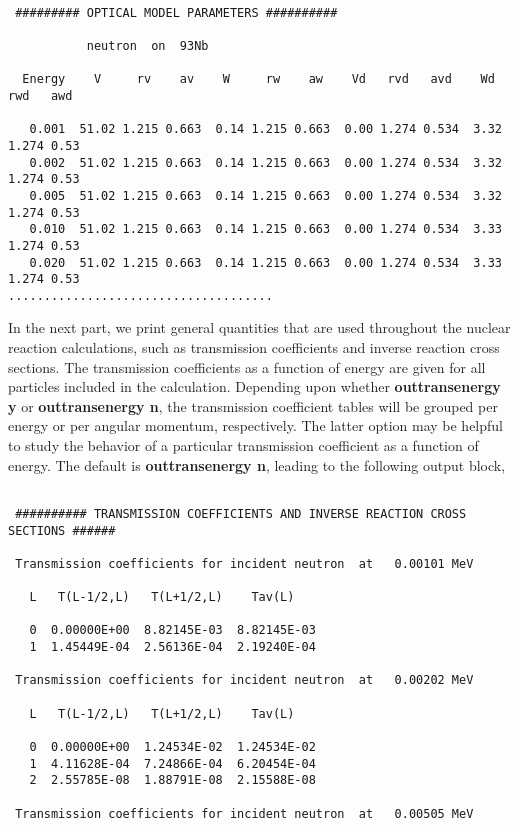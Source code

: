 \begin{samplecase}
{\small \begin{verbatim}

 ######### OPTICAL MODEL PARAMETERS ##########
 
           neutron  on  93Nb
 
  Energy    V     rv    av    W     rw    aw    Vd   rvd   avd    Wd   rwd   awd

   0.001  51.02 1.215 0.663  0.14 1.215 0.663  0.00 1.274 0.534  3.32 1.274 0.53
   0.002  51.02 1.215 0.663  0.14 1.215 0.663  0.00 1.274 0.534  3.32 1.274 0.53
   0.005  51.02 1.215 0.663  0.14 1.215 0.663  0.00 1.274 0.534  3.32 1.274 0.53
   0.010  51.02 1.215 0.663  0.14 1.215 0.663  0.00 1.274 0.534  3.33 1.274 0.53
   0.020  51.02 1.215 0.663  0.14 1.215 0.663  0.00 1.274 0.534  3.33 1.274 0.53
.....................................
\end{verbatim} } \renewcommand{\baselinestretch}{1.07}\small\normalsize
\noindent
In the next part, we print general quantities that are used throughout the 
nuclear reaction calculations, such as transmission coefficients and inverse 
reaction cross sections.
The transmission coefficients as
a function of energy are given for all particles included in the calculation.
Depending upon whether {\bf outtransenergy y} or {\bf outtransenergy n}, the 
transmission coefficient tables will be grouped per energy or per angular 
momentum, respectively. The latter option may be helpful to study the behavior 
of a particular transmission coefficient as a function of energy.
The default is {\bf outtransenergy n}, leading to the following output block,

{\small \begin{verbatim}

 ########## TRANSMISSION COEFFICIENTS AND INVERSE REACTION CROSS SECTIONS ######
 
 Transmission coefficients for incident neutron  at   0.00101 MeV
 
   L   T(L-1/2,L)   T(L+1/2,L)    Tav(L)  
  
   0  0.00000E+00  8.82145E-03  8.82145E-03
   1  1.45449E-04  2.56136E-04  2.19240E-04
  
 Transmission coefficients for incident neutron  at   0.00202 MeV
  
   L   T(L-1/2,L)   T(L+1/2,L)    Tav(L)
  
   0  0.00000E+00  1.24534E-02  1.24534E-02
   1  4.11628E-04  7.24866E-04  6.20454E-04
   2  2.55785E-08  1.88791E-08  2.15588E-08
  
 Transmission coefficients for incident neutron  at   0.00505 MeV
  

\end{verbatim}}
\end{samplecase}
